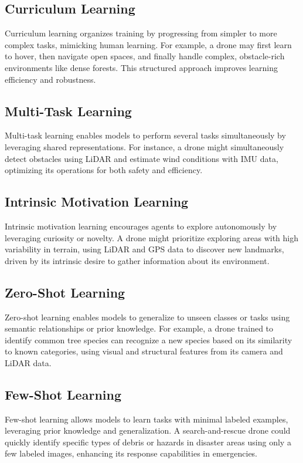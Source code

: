 \subsection{Curriculum Learning}
Curriculum learning organizes training by progressing from simpler to more complex tasks, mimicking human learning. For example, a drone may first learn to hover, then navigate open spaces, and finally handle complex, obstacle-rich environments like dense forests. This structured approach improves learning efficiency and robustness. \cite{bengio-2009-curriculum-learning}

\subsection{Multi-Task Learning}
Multi-task learning enables models to perform several tasks simultaneously by leveraging shared representations. For instance, a drone might simultaneously detect obstacles using LiDAR and estimate wind conditions with IMU data, optimizing its operations for both safety and efficiency. \cite{caruana-1997-multi-task-learning}

\subsection{Intrinsic Motivation Learning}
Intrinsic motivation learning encourages agents to explore autonomously by leveraging curiosity or novelty. A drone might prioritize exploring areas with high variability in terrain, using LiDAR and GPS data to discover new landmarks, driven by its intrinsic desire to gather information about its environment. \cite{oudeyer-2007-intrinsic-motivation}

\subsection{Zero-Shot Learning}
Zero-shot learning enables models to generalize to unseen classes or tasks using semantic relationships or prior knowledge. For example, a drone trained to identify common tree species can recognize a new species based on its similarity to known categories, using visual and structural features from its camera and LiDAR data. \cite{larochelle-2008-zero-shot-learning}

\subsection{Few-Shot Learning}
Few-shot learning allows models to learn tasks with minimal labeled examples, leveraging prior knowledge and generalization. A search-and-rescue drone could quickly identify specific types of debris or hazards in disaster areas using only a few labeled images, enhancing its response capabilities in emergencies. \cite{vinyals-2016-few-shot-learning}

